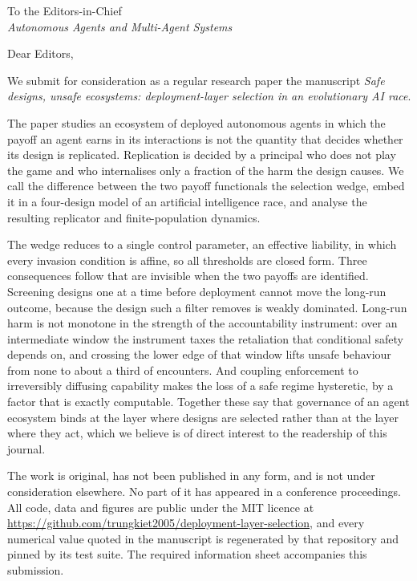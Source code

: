 \documentclass[11pt,a4paper]{article}
\begin{document}
\noindent
To the Editors-in-Chief\\
\textit{Autonomous Agents and Multi-Agent Systems}

\bigskip

\noindent
Dear Editors,

We submit for consideration as a regular research paper the manuscript
\textit{Safe designs, unsafe ecosystems: deployment-layer selection in an
evolutionary AI race}.

The paper studies an ecosystem of deployed autonomous agents in which the
payoff an agent earns in its interactions is not the quantity that decides
whether its design is replicated. Replication is decided by a principal who
does not play the game and who internalises only a fraction of the harm the
design causes. We call the difference between the two payoff functionals the
selection wedge, embed it in a four-design model of an artificial intelligence
race, and analyse the resulting replicator and finite-population dynamics.

The wedge reduces to a single control parameter, an effective liability, in
which every invasion condition is affine, so all thresholds are closed form.
Three consequences follow that are invisible when the two payoffs are
identified. Screening designs one at a time before deployment cannot move the
long-run outcome, because the design such a filter removes is weakly dominated.
Long-run harm is not monotone in the strength of the accountability instrument:
over an intermediate window the instrument taxes the retaliation that
conditional safety depends on, and crossing the lower edge of that window lifts
unsafe behaviour from none to about a third of encounters. And coupling
enforcement to irreversibly diffusing capability makes the loss of a safe
regime hysteretic, by a factor that is exactly computable. Together these say
that governance of an agent ecosystem binds at the layer where designs are
selected rather than at the layer where they act, which we believe is of direct
interest to the readership of this journal.

The work is original, has not been published in any form, and is not under
consideration elsewhere. No part of it has appeared in a conference
proceedings. All code, data and figures are public under the MIT licence at
\url{https://github.com/trungkiet2005/deployment-layer-selection}, and every
numerical value quoted in the manuscript is regenerated by that repository and
pinned by its test suite. The required information sheet accompanies this
submission.
\end{document}
